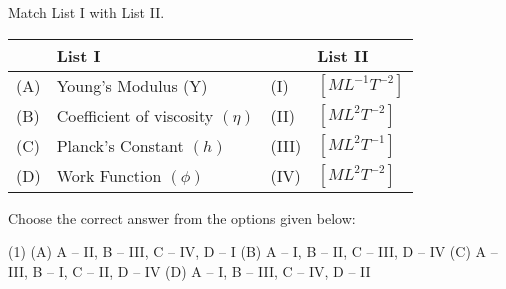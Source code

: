 \item Match List I with List II.

\begin{center}
    \renewcommand{\arraystretch}{2}
    \begin{table}[h]
        \centering
        \begin{tabular}{p{0.25cm}p{8cm}|p{0.25cm}p{5cm}}
        \hline
        & List I & &List II \\
        \hline
        (A)& Young's Modulus (Y) & (I) & $[ML^{-1}T^{-2}]$ \\
        (B)& Coefficient of viscosity $(\eta)$ & (II) & $[ML^2T^{-2}]$ \\
        (C)& Planck’s Constant $(h)$ & (III) & $[ML^2T^{-1}]$ \\
        (D)& Work Function $(\phi)$ & (IV) & $[ML^2T^{-2}]$ \\
        \hline
        \end{tabular}
    \end{table}
\end{center}

Choose the correct answer from the options given below:

\begin{tasks}(1)
    \task (A) A – II, B – III, C – IV, D – I
    \task (B) A – I, B – II, C – III, D – IV
    \task (C) A – III, B – I, C – II, D – IV
    \task (D) A – I, B – III, C – IV, D – II
\end{tasks}
